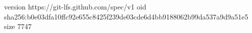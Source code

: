 version https://git-lfs.github.com/spec/v1
oid sha256:b0e03dfa10ffc92e655c8425f239de03cde6d4bb9188062b99da537a9d9a51e5
size 7747
